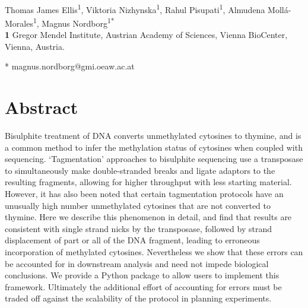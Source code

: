 \documentclass[10pt,draft,letterpaper]{article}
\begin{document}
\vspace*{0.2in}

\begin{flushleft}
{\Large
\textbf{} %
}
\newline
\\
Thomas James Ellis\textsuperscript{1},
Viktoria Nizhynska\textsuperscript{1},
Rahul Pisupati\textsuperscript{1},
Almudena Moll\'a-Morales\textsuperscript{1},
Magnus Nordborg\textsuperscript{1*}
\\
\bigskip
\textbf{1} Gregor Mendel Institute, Austrian Academy of Sciences, Vienna BioCenter, Vienna, Austria.
\\
\bigskip

* magnus.nordborg@gmi.oeaw.ac.at

\end{flushleft}
\section*{Abstract}
Bisulphite treatment of DNA converts unmethylated cytosines to thymine, and is a common method to infer the methylation status of cytosines when coupled with sequencing.
`Tagmentation' approaches to bisulphite sequencing use a transposase to simultaneously make double-stranded breaks and ligate adaptors to the resulting fragments, allowing for higher throughput with less starting material.
However, it has also been noted that certain tagmentation protocols have an unusually high number unmethylated cytosines that are not converted to thymine.
Here we describe this phenomenon in detail, and find that results are consistent with single strand nicks by the transposase, followed by strand displacement of part or all of the DNA fragment, leading to erroneous incorporation of methylated cytosines.
Nevertheless we show that these errors can be accounted for in downstream analysis and need not impede biological conclusions.
We provide a Python package to allow users to implement this framework.
Ultimately the additional effort of accounting for errors must be traded off against the scalability of the protocol in planning experiments.
\end{document}
